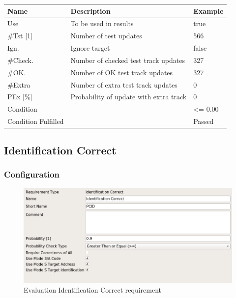 \begin{center}
 \begin{table}[H]
  \begin{tabularx}{\textwidth}{ | l | X |  l | }
    \hline
    \textbf{Name} & \textbf{Description} & \textbf{Example} \\ \hline
    Use & To be used in results & true \\ \hline
    \#Tst [1] & Number of test updates & 566 \\ \hline
    Ign. & Ignore target & false \\ \hline
    \#Check. & Number of checked test track updates & 327 \\ \hline
    \#OK. & Number of OK test track updates & 327 \\ \hline
    \#Extra & Number of extra test track updates & 0 \\ \hline
    PEx [\%] & Probability of update with extra track & 0 \\ \hline
    Condition &  & <= 0.00 \\ \hline
    Condition Fulfilled &  & Passed \\ \hline
\end{tabularx}
\end{table}
\end{center}


\subsection{Identification Correct}
\label{sec:eval_req_id_correct} 

\subsubsection{Configuration}

\begin{figure}[H]
    \includegraphics[width=14cm,frame]{../screenshots/eval_req_id_correct.png}
  \caption{Evaluation Identification Correct requirement}
\end{figure}

